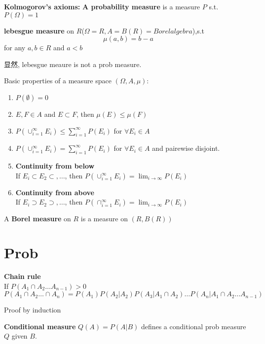 \documentclass{article}
\begin{document}
\begin{definition}
\textbf{Kolmogorov's axioms: }
\textbf{A probability measure} is a measure $P$ s.t. $P(\Omega) = 1$
\end{definition}

\begin{definition}
\textbf{lebesgue measure} on $R$($\Omega = R, A = B(R) = Borel algebra$),s.t
$$\mu(a,b) = b -a$$ for any $a,b \in R$ and $a < b$
\end{definition}
显然, lebesgue meaure is not a prob measure.

Basic properties of a measure space $(\Omega, A, \mu)$:
\begin{enumerate}
\item $P(\emptyset) = 0$
\item $E,F \in A$ and $E \subset F$, then $\mu(E) \leq \mu(F)$
\item $P(\cup_{i=1}^{\infty} E_i) \leq \sum_{i=1}^{\infty}P(E_i)$ for $\forall E_i \in A$
\item $P(\cup_{i=1}^{\infty} E_i) = \sum_{i=1}^{\infty}P(E_i)$ for $\forall E_i \in A$ and pairewise disjoint.
\item \textbf{Continuity from below}\\
If $E_i \subset E_2 \subset,\ldots $, then $P(\cup_{i=1}^{\infty} E_i) = \lim_{i \to \infty} P(E_i)$
\item \textbf{Continuity from above}\\
If $E_i \supset E_2 \supset,\ldots $, then $P(\cap_{i=1}^{\infty} E_i) = \lim_{i \to \infty} P(E_i)$
\end{enumerate}

\begin{definition}
A \textbf{Borel measure} on $R$ is a measure on $(R, B(R))$
\end{definition}

\section{Prob}
\begin{theorem}
\textbf{Chain rule}\\
If $P(A_1 \cap A_2 \ldots A_{n-1}) > 0$
$$ P(A_1 \cap A_2 \ldots \cap A_n) = P(A_1) P(A_2 | A_2) P(A_3 | A_1 \cap A_2) \ldots P(A_n | A_1 \cap A_2 \ldots A_{n-1}) $$
\end{theorem}
Proof by induction

\begin{definition}
\textbf{Conditional measure} $Q(A) = P(A|B)$ defines a conditional prob measure $Q$ given $B$.
\end{definition}
\end{document}
